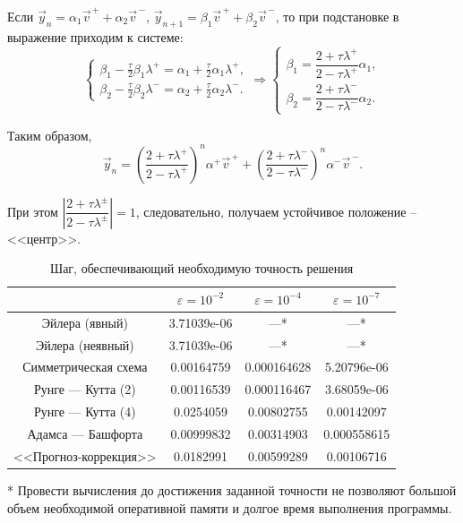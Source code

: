\documentclass[12pt, a4paper]{article}
\begin{document}
	Если $\vec{y}_n = \alpha_1 \vec{v}^{\,+} + \alpha_2 \vec{v}^{\,-}$, $\vec{y}_{n+1} = \beta_1 \vec{v}^{\,+} + \beta_2 \vec{v}^{\,-}$, то при подстановке в выражение приходим к системе:
	\begin{equation*}
		\begin{cases}
			\beta_1 - \frac\tau2 \beta_1 \lambda^+ = \alpha_1 + \frac\tau2 \alpha_1 \lambda^+, \\
			\beta_2 - \frac\tau2 \beta_2 \lambda^- = \alpha_2 + \frac\tau2 \alpha_2 \lambda^-.
		\end{cases} \Rightarrow
		\begin{cases}
			\beta_1 = \dfrac{2+\tau\lambda^+}{2-\tau\lambda^+}\alpha_1, \\[6pt]
			\beta_2 = \dfrac{2+\tau\lambda^-}{2-\tau\lambda^-}\alpha_2.
		\end{cases}
	\end{equation*}
	
	Таким образом,
	\begin{equation*}
		\vec{y}_n = \left(\frac{2+\tau\lambda^+}{2-\tau\lambda^+}\right)^n \alpha^+ \vec{v}^{\,+} + \left(\frac{2+\tau\lambda^-}{2-\tau\lambda^-}\right)^n \alpha^- \vec{v}^{\,-}.
	\end{equation*}
	
	При этом $\left|\dfrac{2+\tau\lambda^\pm}{2-\tau\lambda^\pm}\right| = 1$, следовательно, получаем устойчивое положение -- <<центр>>.
	
	\begin{table}[H]
		\caption{Шаг, обеспечивающий необходимую точность решения}
		\begin{center}
			\begin{tabular}{|c|c|c|c|}
				\hline
				\makecell{Метод}&$\varepsilon = 10^{-2}$&$\varepsilon = 10^{-4}$&$\varepsilon = 10^{-7}$\\
				\hline
				Эйлера (явный)& 3.71039e-06 & ---* & ---* \\
				\hline
				Эйлера (неявный)& 3.71039e-06 & ---* & ---* \\
				\hline
				Симметрическая схема& 0.00164759 & 0.000164628 & 5.20796e-06 \\
				\hline
				Рунге --- Кутта (2)& 0.00116539 & 0.000116467 & 3.68059e-06 \\
				\hline
				Рунге --- Кутта (4)& 0.0254059 & 0.00802755 & 0.00142097 \\
				\hline
				Адамса --- Башфорта& 0.00999832 & 0.00314903 & 0.000558615 \\
				\hline
				<<Прогноз-коррекция>>& 0.0182991 & 0.00599289 & 0.00106716 \\
				\hline
			\end{tabular}
		\end{center}
	\end{table}
	* Провести вычисления до достижения заданной точности не позволяют большой объем необходимой оперативной памяти и долгое время выполнения программы.
	
\end{document}
